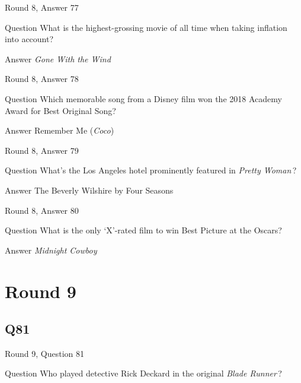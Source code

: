 \documentclass[11pt]{beamer}
\begin{document}
\begin{frame}[t]{Round 8, Answer 77}
\vspace{2em}
\begin{block}{Question}
What is the highest-grossing movie of all time when taking inflation into account?
\end{block}
\pause{}
\begin{block}{Answer}
\emph{Gone With the Wind}
\end{block}
\end{frame}
    

\begin{frame}[t]{Round 8, Answer 78}
\vspace{2em}
\begin{block}{Question}
Which memorable song from a Disney film won the 2018 Academy Award for Best Original Song?
\end{block}
\pause{}
\begin{block}{Answer}
Remember Me (\emph{Coco})
\end{block}
\end{frame}
    

\begin{frame}[t]{Round 8, Answer 79}
\vspace{2em}
\begin{block}{Question}
What's the Los Angeles hotel prominently featured in \emph{Pretty Woman}\,?
\end{block}
\pause{}
\begin{block}{Answer}
The Beverly Wilshire by Four Seasons
\end{block}
\end{frame}
    

\begin{frame}[t]{Round 8, Answer 80}
\vspace{2em}
\begin{block}{Question}
What is the only `X'-rated film to win Best Picture at the Oscars?
\end{block}
\pause{}
\begin{block}{Answer}
\emph{Midnight Cowboy}
\end{block}
\end{frame}
    

\section{Round 9}
    

\subsection*{Q81}
\begin{frame}[t]{Round 9, Question 81}
\vspace{2em}
\begin{block}{Question}
Who played detective Rick Deckard in the original \emph{Blade Runner}\,?
\end{block}
\end{frame}
    
\end{document}
